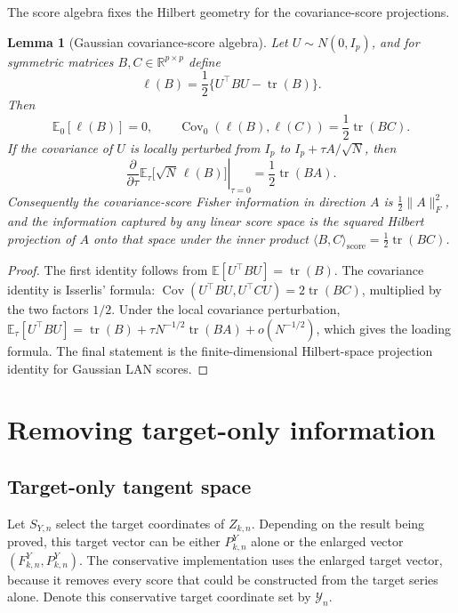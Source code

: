 \documentclass[11pt,a4paper]{amsart}
\theoremstyle{plain}
\newtheorem{lemma}[theorem]{Lemma}
\theoremstyle{definition}
\theoremstyle{remark}
\DeclareMathOperator{\Cov}{Cov}
\DeclareMathOperator{\tr}{tr}
\newcommand{\R}{\mathbb{R}}
\newcommand{\EE}{\mathbb{E}}
\newcommand{\scrY}{\mathcal{Y}}
\begin{document}
The score algebra fixes the Hilbert geometry for the covariance-score projections.

\begin{lemma}[Gaussian covariance-score algebra]\label{lem:cov-score-algebra}
Let \(U\sim N(0,I_p)\), and for symmetric matrices \(B,C\in\R^{p\times p}\) define
\[
        \ell(B)=\frac12\{U^\top BU-\tr(B)\}.
\]
Then
\[
        \EE_0[\ell(B)]=0,
        \qquad
        \Cov_0(\ell(B),\ell(C))
        =
        \frac12\tr(BC).
\]
If the covariance of \(U\) is locally perturbed from \(I_p\) to
\(I_p+\tau A/\sqrt{N}\), then
\[
        \left.
        \frac{\partial}{\partial\tau}
        \EE_\tau\bigl[\sqrt{N}\,\ell(B)\bigr]
        \right|_{\tau=0}
        =
        \frac12\tr(BA).
\]
Consequently the covariance-score Fisher information in direction \(A\) is
\(\frac12\|A\|_F^2\), and the information captured by any linear score space is the squared
Hilbert projection of \(A\) onto that space under the inner product
\(\langle B,C\rangle_{\mathrm{score}}=\frac12\tr(BC)\).
\end{lemma}

\begin{proof}
The first identity follows from \(\EE[U^\top BU]=\tr(B)\).  The covariance identity is Isserlis'
formula:
\(\Cov(U^\top BU,U^\top CU)=2\tr(BC)\), multiplied by the two factors \(1/2\).  Under the local
covariance perturbation,
\(\EE_\tau[U^\top BU]=\tr(B)+\tau N^{-1/2}\tr(BA)+o(N^{-1/2})\), which gives the loading formula.
The final statement is the finite-dimensional Hilbert-space projection identity for Gaussian LAN
scores.
\end{proof}

\section{Removing target-only information}\label{sec:target-projection}

\subsection{Target-only tangent space}

Let \(S_{Y,n}\) select the target coordinates of \(Z_{k,n}\).  Depending on the result being
proved, this
target vector can be either \(P_{k,n}^{Y}\) alone or the enlarged vector
\((F_{k,n}^{Y},P_{k,n}^{Y})\).  The conservative implementation uses the enlarged target vector,
because it removes every score that could be constructed from the target series alone.  Denote this
conservative target coordinate set by \(\scrY_n\).
\end{document}

